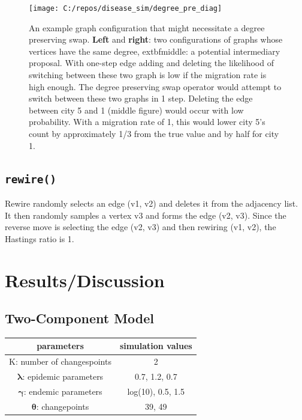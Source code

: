 \documentclass[11pt,a4paper]{article}
\numberwithin{equation}{section}
\begin{document}
\begin{figure}

{\centering \texttt{[image: C:/repos/disease\_sim/degree\_pre\_diag]} 

}

\caption{\label{fig:deg_pre}An example graph configuration that might necessitate a degree preserving swap. \textbf{Left} and \textbf{right}: two configurations of graphs whose vertices have the same degree,     extbf{middle}: a potential intermediary proposal. With one-step edge adding and deleting the likelihood of switching between these two graph is low if the migration rate is high enough. The degree preserving swap operator would attempt to switch between these two graphs in 1 step. Deleting the edge between city 5 and 1 (middle figure) would occur with low probability. With a migration rate of 1, this would lower city 5's count by approximately 1/3 from the true value and by half for city 1.}\label{fig:unnamed-chunk-2}
\end{figure}

\hypertarget{rewire}{%
\subsection{\texorpdfstring{\texttt{rewire()}}{rewire()}}\label{rewire}}

Rewire randomly selects an edge (v1, v2) and deletes it from the
adjacency list. It then randomly samples a vertex v3 and forms the edge
(v2, v3). Since the reverse move is selecting the edge (v2, v3) and then
rewiring (v1, v2), the Hastings ratio is 1.

\hypertarget{resultsdiscussion}{%
\section{Results/Discussion}\label{resultsdiscussion}}

\hypertarget{two-component-model}{%
\subsection{Two-Component Model}\label{two-component-model}}

\begin{longtable}[]{@{}cc@{}}
\toprule
parameters & simulation values\tabularnewline
\midrule
\endhead
K: number of changespoints & 2\tabularnewline
\(\boldsymbol{\lambda}\): epidemic parameters & 0.7, 1.2,
0.7\tabularnewline
\(\boldsymbol{\gamma}\): endemic parameters & log(10), 0.5,
1.5\tabularnewline
\(\boldsymbol{\theta}\): changepoints & 39, 49\tabularnewline
\bottomrule
\end{longtable}
\end{document}
